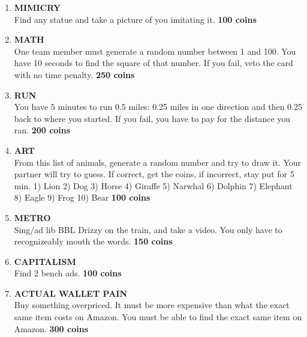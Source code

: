 \documentclass{article}
\begin{document}
\begin{enumerate}
    \item \textbf{MIMICRY}\\ Find any statue and take a picture of you imitating it. \textbf{100 coins}
    \item \textbf{MATH} \\ One team member must generate a random number between 1 and 100. You have 10 seconds to find the square of that number. If you fail, veto the card with no time penalty. \textbf{250 coins}
    \item \textbf{RUN}\\ You have 5 minutes to run 0.5 miles: 0.25 miles in one direction and then 0.25 back to where you started. If you fail, you have to pay for the distance you ran. \textbf{200 coins}
    \item \textbf{ART}\\ From this list of animals, generate a random number and try to draw it. Your partner will try to guess. If correct, get the coins, if incorrect, stay put for 5 min. 1) Lion 2) Dog 3) Horse 4) Giraffe 5) Narwhal 6) Dolphin 7) Elephant 8) Eagle 9) Frog 10) Bear \textbf{100 coins}
    \item \textbf{METRO} \\ Sing/ad lib BBL Drizzy on the train, and take a video. You only have to recognizeably mouth the words. \textbf{150 coins}
    \item \textbf{CAPITALISM} \\ Find 2 bench ads. \textbf{100 coins}
    \item \textbf{ACTUAL WALLET PAIN} \\ Buy something overpriced. It must be more expensive than what the exact same item costs on Amazon. You must be able to find the exact same item on Amazon. \textbf{300 coins}
    
\end{enumerate}
\end{document}
